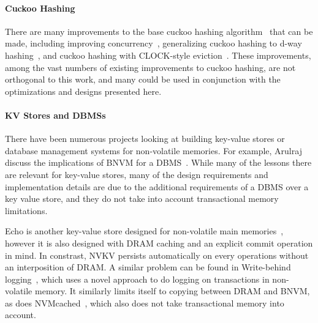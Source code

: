 \paragraph{Cuckoo Hashing}

There are many improvements to the base cuckoo hashing
algorithm~\cite{Pagh:2004} that can be made, including improving
concurrency~\cite{Li:2014ch}, generalizing cuckoo hashing to d-way
hashing~\cite{Fotakis:hashing}, and cuckoo hashing with CLOCK-style
eviction~\cite{Fan:2013}. These improvements, among the vast numbers of existing
improvements to cuckoo hashing, are not orthogonal to this work, and many could
be used in conjunction with the optimizations and designs presented here.

\paragraph{KV Stores and DBMSs}

There have been numerous projects looking at building key-value stores or
database management systems for non-volatile memories. For example, Arulraj
\etal discuss the implications of BNVM for a DBMS~\cite{Arulraj:2017}. While
many of the lessons there are relevant for key-value stores, many of the design
requirements and implementation details are due to the additional requirements
of a DBMS over a key value store, and they do not take into account
transactional memory limitations.


Echo is another key-value store designed for non-volatile main
memories~\cite{echo}, however it is also designed with DRAM caching and an
explicit commit operation in mind. In constrast, NVKV persists automatically on
every operations without an interposition of DRAM. A similar problem can be
found in Write-behind logging~\cite{Arulraj:2016wbl}, which uses a novel approach to do logging on
transactions in non-volatile memory. It similarly limits itself to copying
between DRAM and BNVM, as does NVMcached~\cite{Wu:2016}, which also does not
take transactional memory into account.


